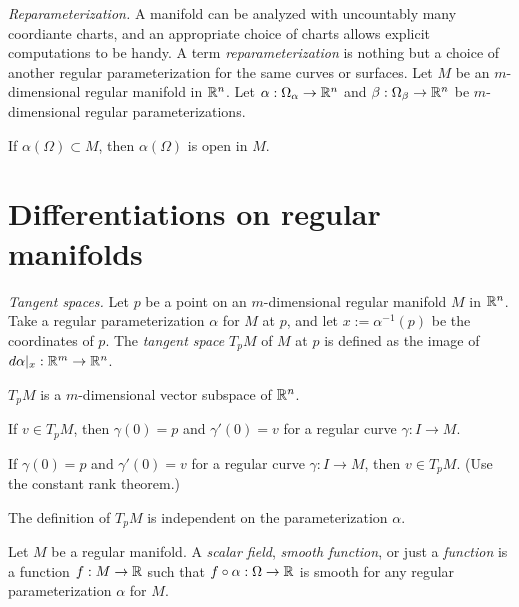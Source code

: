 \documentclass{../note}
\def\a{\alpha}
\begin{document}
\begin{prb}\emph{Reparameterization.}
A manifold can be analyzed with uncountably many coordiante charts, and an appropriate choice of charts allows explicit computations to be handy.
A term \emph{reparameterization} is nothing but a choice of another regular parameterization for the same curves or surfaces.
Let $M$ be an $m$-dimensional regular manifold in $\mathbb{R}^n$.
Let $\a:\Omega_\a\to\R^n$ and $\beta:\Omega_\beta\to\mathbb{R}^n$ be $m$-dimensional regular parameterizations.
\begin{parts}
\item If $\a(\Omega)\subset M$, then $\a(\Omega)$ is open in $M$.
\end{parts}
\end{prb}


\section{Differentiations on regular manifolds}


\begin{prb}\emph{Tangent spaces.}
Let $p$ be a point on an $m$-dimensional regular manifold $M$ in $\mathbb{R}^n$.
Take a regular parameterization $\a$ for $M$ at $p$, and let $x:=\a^{-1}(p)$ be the coordinates of $p$.
The \emph{tangent space} $T_pM$ of $M$ at $p$ is defined as the image of $d\a|_x:\R^m\to\R^n$.
\begin{parts}
\item $T_pM$ is a $m$-dimensional vector subspace of $\mathbb{R}^n$.
\item If $v\in T_pM$, then $\gamma(0)=p$ and $\gamma'(0)=v$ for a regular curve $\gamma:I\to M$.
\item If $\gamma(0)=p$ and $\gamma'(0)=v$ for a regular curve $\gamma:I\to M$, then $v\in T_pM$. (Use the constant rank theorem.)
\item The definition of $T_pM$ is independent on the parameterization $\a$.
\end{parts}
\end{prb}

\begin{prb}
Let $M$ be a regular manifold.
A \emph{scalar field}, \emph{smooth function}, or just a \emph{function} is a function $f:M\to\mathbb{R}$ such that $f\circ\a:\Omega\to\R$ is smooth for any regular parameterization $\a$ for $M$.
\begin{parts}
\item 
\end{parts}
\end{prb}
\end{document}
